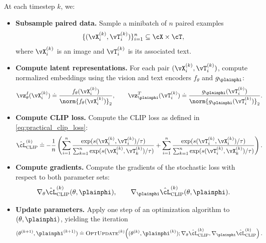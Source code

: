 \documentclass[../../book-main.tex]{subfiles}
\begin{document}
At each timestep \(k\), we:
\begin{itemize}
    \item \textbf{Subsample paired data.} Sample a minibatch of \(n\)
    paired examples
    \begin{equation}
        \{(\vX_{i}^{(k)}, \vT_{i}^{(k)})\}_{i=1}^{n} \subseteq \cX \times \cT ,
    \end{equation}
    where \(\vX_{i}^{(k)}\) is an image and \(\vT_{i}^{(k)}\) is its
    associated text.
    \item \textbf{Compute latent representations.} For each pair
    \((\vX_{i}^{(k)}, \vT_{i}^{(k)})\), compute normalized embeddings using the vision and text encoders \(f_{\theta}\) and \(g_{\plainphi}\):
    \begin{equation}
        \vz_{\theta}^{I}(\vX_{i}^{(k)}) \doteq \frac{f_{\theta}(\vX_{i}^{(k)})}{\norm{f_{\theta}(\vX_{i}^{(k)})}_{2}},
        \qquad
        \vz_{\plainphi}^{T}(\vT_{i}^{(k)}) \doteq \frac{g_{\plainphi}(\vT_{i}^{(k)})}{\norm{g_{\plainphi}(\vT_{i}^{(k)})}_{2}} .
    \end{equation}

    \item \textbf{Compute CLIP loss.} Compute the CLIP loss as defined in \eqref{eq:practical_clip_loss}:
    \begin{equation}
        \hat{\cL}_{\mathrm{CLIP}}^{(k)}
        \doteq
        -\frac{1}{n}\left(    
        \sum_{i=1}^{n}
        \frac{\exp(s(\vX_{i}^{(k)}, \vT_{i}^{(k)})/\tau)}{\sum_{k=1}^{n}\exp(s(\vX_{i}^{(k)}, \vT_{k}^{(k)})/\tau)}
        +
        \sum_{i=1}^{n}
        \frac{\exp(s(\vT_{i}^{(k)}, \vX_{i}^{(k)})/\tau)}{\sum_{k=1}^{n}\exp(s(\vT_{i}^{(k)}, \vX_{k}^{(k)})/\tau)}
        \right) .
    \end{equation}

    \item \textbf{Compute gradients.} Compute the gradients of the
    stochastic loss with respect to both parameter sets:
    \begin{equation}
        \nabla_{\theta}\hat{\cL}_{\mathrm{CLIP}}^{(k)}(\theta, \plainphi),
        \qquad
        \nabla_{\plainphi}\hat{\cL}_{\mathrm{CLIP}}^{(k)}(\theta, \plainphi) .
    \end{equation}

    \item \textbf{Update parameters.} Apply one step of an
    optimization algorithm to \((\theta, \plainphi)\), yielding the
    iteration
    \begin{equation}
        (\theta^{(k+1)}, \plainphi^{(k+1)})
        \doteq
        \textsc{OptUpdate}^{(k)}\!\left(
        (\theta^{(k)}, \plainphi^{(k)});
        \nabla_{\theta}\hat{\cL}_{\mathrm{CLIP}}^{(k)},
        \nabla_{\plainphi}\hat{\cL}_{\mathrm{CLIP}}^{(k)}
        \right) .
    \end{equation}
\end{itemize}
\end{document}
